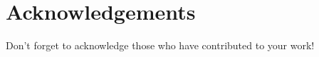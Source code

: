 
\section*{Acknowledgements}
Don't forget to acknowledge those who have contributed to your work!
\blindtext